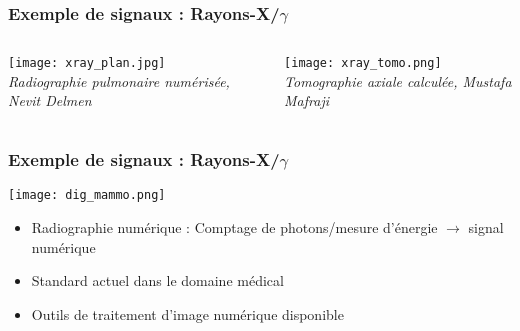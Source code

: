 \documentclass{beamer}
\begin{document}
\begin{frame}
\frametitle{Exemple de signaux : Rayons-X/$\gamma$}
\begin{columns}
\column{60mm}
\begin{center}
\texttt{[image: xray\_plan.jpg]}\\
\textit{Radiographie pulmonaire numérisée, Nevit Delmen}
\end{center}
\column{60mm}
\begin{center}
\texttt{[image: xray\_tomo.png]}\\
\textit{Tomographie axiale calculée, Mustafa Mafraji}
\end{center}
\end{columns}
\end{frame}

\begin{frame}
\frametitle{Exemple de signaux : Rayons-X/$\gamma$}
\begin{center}
\texttt{[image: dig\_mammo.png]}\\
\end{center}
\begin{itemize}
\item Radiographie numérique : Comptage de photons/mesure d'énergie $\rightarrow$ signal numérique
\item Standard actuel dans le domaine médical
\item Outils de traitement d'image numérique disponible
\end{itemize}
\end{frame}
\end{document}
